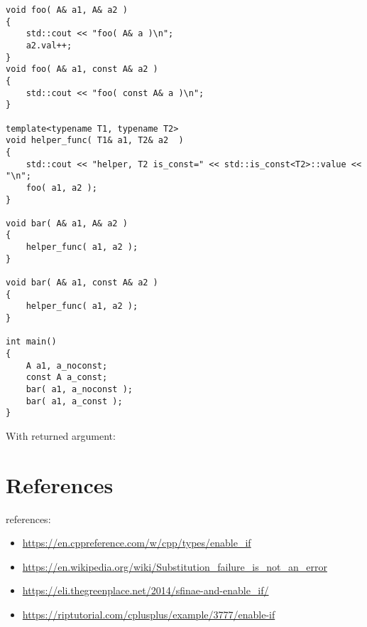 \documentclass[11pt,a4paper,landscape,twocolumn]{article}
\begin{document}
\begin{lstlisting}
void foo( A& a1, A& a2 )
{
    std::cout << "foo( A& a )\n";
    a2.val++;
}
void foo( A& a1, const A& a2 )
{
    std::cout << "foo( const A& a )\n";
}

template<typename T1, typename T2>
void helper_func( T1& a1, T2& a2  )
{
    std::cout << "helper, T2 is_const=" << std::is_const<T2>::value << "\n";
	foo( a1, a2 );
}

void bar( A& a1, A& a2 )
{
	helper_func( a1, a2 );
}

void bar( A& a1, const A& a2 )
{
	helper_func( a1, a2 );
}
 
int main()
{
    A a1, a_noconst;
    const A a_const;
    bar( a1, a_noconst );
    bar( a1, a_const );
}
\end{lstlisting}

With returned argument:



\section{References}


references:
\begin{itemize}
\item \url{https://en.cppreference.com/w/cpp/types/enable_if}
\item \url{https://en.wikipedia.org/wiki/Substitution_failure_is_not_an_error}
\item \url{https://eli.thegreenplace.net/2014/sfinae-and-enable_if/}
\item \url{https://riptutorial.com/cplusplus/example/3777/enable-if}
\end{itemize}
\end{document}
